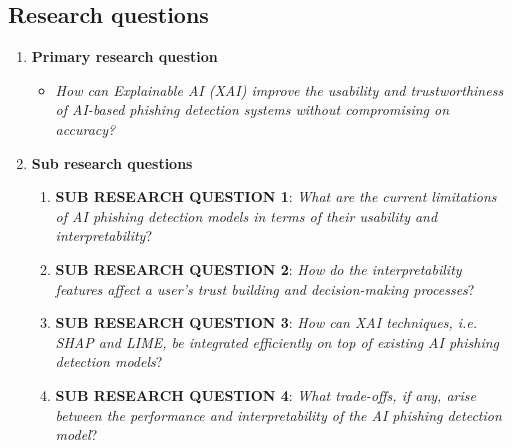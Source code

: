 
\subsection*{Research questions}

\begin{enumerate}
  \item \textbf{Primary research question}
    \begin{itemize}
      \item \textit{How can Explainable AI (XAI) improve the usability and trustworthiness of AI-based phishing detection systems without compromising on accuracy?}
    \end{itemize}
  \item \textbf{Sub research questions}
    \begin{enumerate}
      \item \textbf{SUB RESEARCH QUESTION 1}: \textit{What are the current limitations of AI phishing detection models in terms of their usability and interpretability}?\label{sub-research-q1}
      \item \textbf{SUB RESEARCH QUESTION 2}: \textit{How do the interpretability features affect a user's trust building and decision-making processes}?\label{sub-research-q2}
      \item \textbf{SUB RESEARCH QUESTION 3}: \textit{How can XAI techniques, i.e. SHAP and LIME, be integrated efficiently on top of existing AI phishing detection models}?\label{sub-research-q3}
      \item \textbf{SUB RESEARCH QUESTION 4}: \textit{What trade-offs, if any, arise between the performance and interpretability of the AI phishing detection model}?\label{sub-research-q4}
    \end{enumerate}
\end{enumerate}

